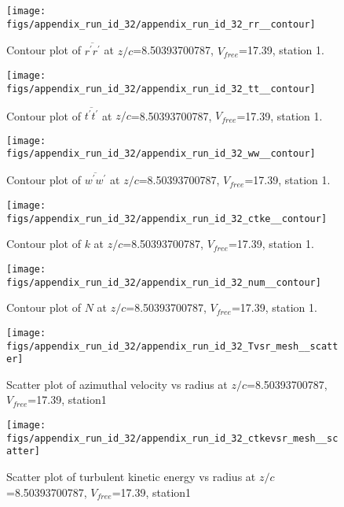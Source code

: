 \begin{figure}[H]
\centering
\texttt{[image: figs/appendix\_run\_id\_32/appendix\_run\_id\_32\_rr\_\_contour]}
\caption{Contour plot of $\overline{r^\prime r^\prime}$ at $z/c$=8.50393700787, $V_{free}$=17.39, station 1.}
\label{fig:appendix_run_id_32_rr__contour}
\end{figure}


\begin{figure}[H]
\centering
\texttt{[image: figs/appendix\_run\_id\_32/appendix\_run\_id\_32\_tt\_\_contour]}
\caption{Contour plot of $\overline{t^\prime t^\prime}$ at $z/c$=8.50393700787, $V_{free}$=17.39, station 1.}
\label{fig:appendix_run_id_32_tt__contour}
\end{figure}


\begin{figure}[H]
\centering
\texttt{[image: figs/appendix\_run\_id\_32/appendix\_run\_id\_32\_ww\_\_contour]}
\caption{Contour plot of $\overline{w^\prime w^\prime}$ at $z/c$=8.50393700787, $V_{free}$=17.39, station 1.}
\label{fig:appendix_run_id_32_ww__contour}
\end{figure}


\begin{figure}[H]
\centering
\texttt{[image: figs/appendix\_run\_id\_32/appendix\_run\_id\_32\_ctke\_\_contour]}
\caption{Contour plot of $k$ at $z/c$=8.50393700787, $V_{free}$=17.39, station 1.}
\label{fig:appendix_run_id_32_ctke__contour}
\end{figure}


\begin{figure}[H]
\centering
\texttt{[image: figs/appendix\_run\_id\_32/appendix\_run\_id\_32\_num\_\_contour]}
\caption{Contour plot of $N$ at $z/c$=8.50393700787, $V_{free}$=17.39, station 1.}
\label{fig:appendix_run_id_32_num__contour}
\end{figure}


\begin{figure}[H]
\centering
\texttt{[image: figs/appendix\_run\_id\_32/appendix\_run\_id\_32\_Tvsr\_mesh\_\_scatter]}
\caption{Scatter plot of azimuthal velocity vs radius at $z/c$=8.50393700787, $V_{free}$=17.39, station1}
\label{fig:appendix_run_id_32_Tvsr_mesh__scatter}
\end{figure}


\begin{figure}[H]
\centering
\texttt{[image: figs/appendix\_run\_id\_32/appendix\_run\_id\_32\_ctkevsr\_mesh\_\_scatter]}
\caption{Scatter plot of turbulent kinetic energy vs radius at $z/c$=8.50393700787, $V_{free}$=17.39, station1}
\label{fig:appendix_run_id_32_ctkevsr_mesh__scatter}
\end{figure}


